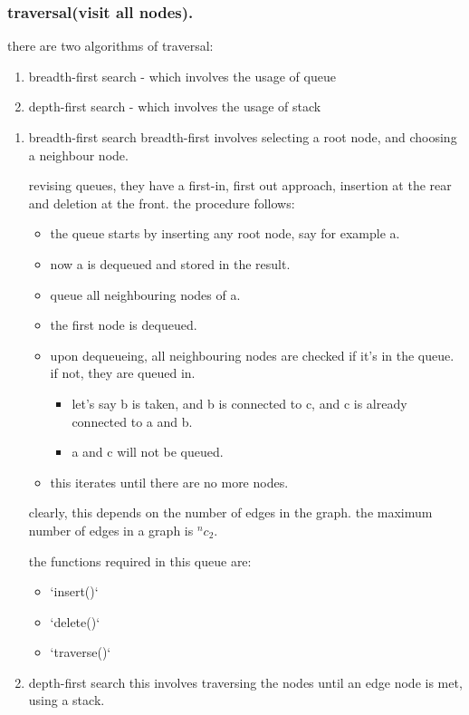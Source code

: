 \documentclass[11pt]{article}
\begin{document}
\subsubsection{traversal(visit all nodes).}
\label{sec:org0839c4a}
there are two algorithms of traversal:
\begin{enumerate}
\item breadth-first search - which involves the usage of queue
\item depth-first search - which involves the usage of stack
\end{enumerate}
\begin{enumerate}
\item breadth-first search
\label{sec:org8983821}
breadth-first involves selecting a root node, and choosing a neighbour node.

revising queues, they have a first-in, first out approach, insertion at the rear and deletion at the front.
the procedure follows:
\begin{itemize}
\item the queue starts by inserting any root node, say for example a.
\item now a is dequeued and stored in the result.
\item queue all neighbouring nodes of a.
\item the first node is dequeued.
\item upon dequeueing, all neighbouring nodes are checked if it's in the queue. if not, they are queued in.
\begin{itemize}
\item let's say b is taken, and b is connected to c, and c is already connected to a and b.
\item a and c will not be queued.
\end{itemize}
\item this iterates until there are no more nodes.
\end{itemize}

clearly, this depends on the number of edges in the graph. the maximum number of edges in a graph is \(^nc_2\).

the functions required in this queue are:
\begin{itemize}
\item `insert()`
\item `delete()`
\item `traverse()`
\end{itemize}
\item depth-first search
\label{sec:orgfcb65df}
this involves traversing the nodes until an edge node is met, using a stack.


\end{enumerate}
\end{document}
